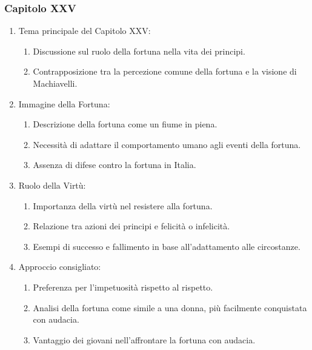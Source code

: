 \documentclass{article}
\begin{document}
\newpage
\subsubsection{Capitolo XXV}

\begin{enumerate}[label*=\arabic*.]
    \item Tema principale del Capitolo XXV:
    \begin{enumerate}[label*=\alph*.]
        \item Discussione sul ruolo della fortuna nella vita dei principi.
        \item Contrapposizione tra la percezione comune della fortuna e la visione di Machiavelli.
    \end{enumerate}
    
    \item Immagine della Fortuna:
    \begin{enumerate}[label*=\alph*.]
        \item Descrizione della fortuna come un fiume in piena.
        \item Necessità di adattare il comportamento umano agli eventi della fortuna.
        \item Assenza di difese contro la fortuna in Italia.
    \end{enumerate}
    
    \item Ruolo della Virtù:
    \begin{enumerate}[label*=\alph*.]
        \item Importanza della virtù nel resistere alla fortuna.
        \item Relazione tra azioni dei principi e felicità o infelicità.
        \item Esempi di successo e fallimento in base all'adattamento alle circostanze.
    \end{enumerate}
    
    \item Approccio consigliato:
    \begin{enumerate}[label*=\alph*.]
        \item Preferenza per l'impetuosità rispetto al rispetto.
        \item Analisi della fortuna come simile a una donna, più facilmente conquistata con audacia.
        \item Vantaggio dei giovani nell'affrontare la fortuna con audacia.
    \end{enumerate}
\end{enumerate}
\end{document}
